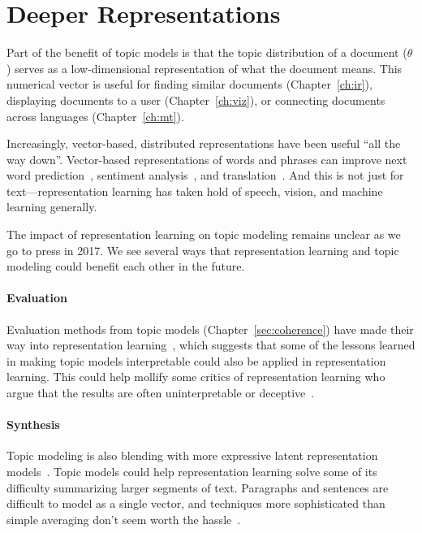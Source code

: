 \section{Deeper Representations}

Part of the benefit of topic models is that the topic distribution of
a document ($\theta$) serves as a low-dimensional representation of
what the document means.  This numerical vector is useful for finding
similar documents (Chapter~\ref{ch:ir}), displaying documents to a user
(Chapter~\ref{ch:viz}), or connecting documents across languages
(Chapter~\ref{ch:mt}).

 Increasingly, vector-based,
distributed representations have been useful ``all the way down''.
Vector-based representations of words and phrases can improve next
word prediction~\citep{bengio-03}, sentiment
analysis~\citep{socher-12}, and translation~\citep{devlin-14}.  And
this is not just for text---representation learning has taken hold of
speech, vision, and machine learning generally.

The impact of representation learning on topic modeling remains
unclear as we go to press in 2017.  We see several ways that
representation learning and topic modeling could benefit each other in
the future.

\paragraph{Evaluation}

Evaluation methods from topic models (Chapter~\ref{sec:coherence})
have made their way into representation
learning~\citep{schnabel-15,iyyer-16}, which suggests that some of the
lessons learned in making topic models interpretable could also be
applied in representation learning.  This could help mollify some
critics of representation learning who argue that the results are
often uninterpretable or deceptive~\citep{szegedy-13}.

\paragraph{Synthesis}

Topic modeling is also blending with more expressive latent
representation models~\citep{ranganath-15}.  Topic models could help
representation learning solve some of its difficulty summarizing
larger segments of text.  Paragraphs and sentences are difficult to
model as a single vector, and techniques more sophisticated than
simple averaging don't seem worth the hassle~\citep{iyyer-15}.

